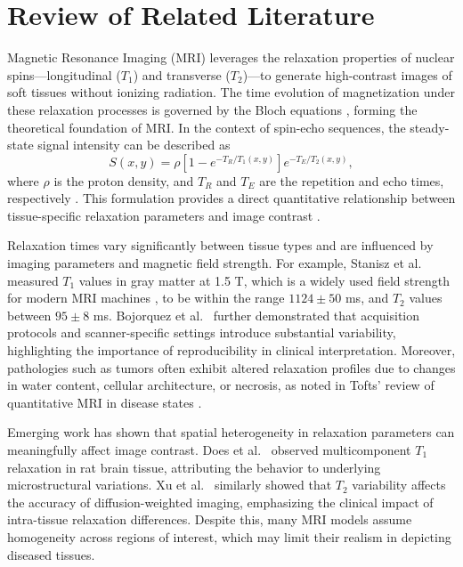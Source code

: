 \documentclass[10pt,a4paper,twoside]{article}
\begin{document}
\section{Review of Related Literature}\label{sec:rrl}

Magnetic Resonance Imaging (MRI) leverages the relaxation properties of nuclear spins---longitudinal ($ T_1 $) and transverse ($ T_2 $)---to generate high-contrast images of soft tissues without ionizing radiation. The time evolution of magnetization under these relaxation processes is governed by the Bloch equations \cite{bloch1946}, forming the theoretical foundation of MRI. In the context of spin-echo sequences, the steady-state signal intensity can be described as
\begin{equation}
S(x, y) = \rho \left[ 1 - e^{-T_R/T_1(x, y)}\right] e^{-T_E/T_2(x, y)},
\label{eq:signal}
\end{equation}
where $ \rho $ is the proton density, and $T_R$ and $T_E$ are the repetition and echo times, respectively \cite{bernstein2004}. This formulation provides a direct quantitative relationship between tissue-specific relaxation parameters and image contrast \cite{brown2014}.

Relaxation times vary significantly between tissue types and are influenced by imaging parameters and magnetic field strength. For example, Stanisz et al.\ \cite{stanisz2005} measured $ T_1 $ values in gray matter at 1.5 T, which is a widely used field strength for modern MRI machines \cite{brown2014}, to be within the range $1124 \pm 50$ ms, and $ T_2 $ values between $95 \pm 8$ ms. Bojorquez et al.\ \cite{bojorquez2017} further demonstrated that acquisition protocols and scanner-specific settings introduce substantial variability, highlighting the importance of reproducibility in clinical interpretation. Moreover, pathologies such as tumors often exhibit altered relaxation profiles due to changes in water content, cellular architecture, or necrosis, as noted in Tofts' review of quantitative MRI in disease states \cite{tofts2003}.

Emerging work has shown that spatial heterogeneity in relaxation parameters can meaningfully affect image contrast. Does et al.\ \cite{does2002} observed multicomponent $ T_1 $ relaxation in rat brain tissue, attributing the behavior to underlying microstructural variations. Xu et al.\ \cite{xu2009} similarly showed that $ T_2 $ variability affects the accuracy of diffusion-weighted imaging, emphasizing the clinical impact of intra-tissue relaxation differences. Despite this, many MRI models assume homogeneity across regions of interest, which may limit their realism in depicting diseased tissues.
\end{document}
